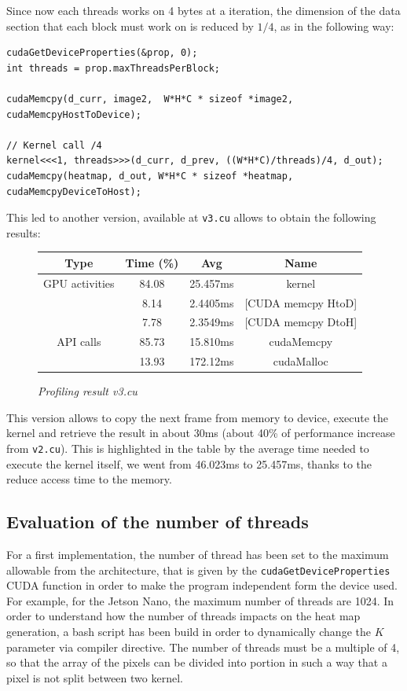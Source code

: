 \documentclass[paper=a4, fontsize=10pt]{scrartcl}	%
\begin{document}
	Since now each threads works on 4 bytes at a iteration, the dimension of the data section that each block must work on is reduced by $1/4$, as in the following way:
		\begin{lstlisting}[style=CStyle]
cudaGetDeviceProperties(&prop, 0);
int threads = prop.maxThreadsPerBlock;

cudaMemcpy(d_curr, image2,  W*H*C * sizeof *image2, cudaMemcpyHostToDevice);

// Kernel call /4
kernel<<<1, threads>>>(d_curr, d_prev, ((W*H*C)/threads)/4, d_out);
cudaMemcpy(heatmap, d_out, W*H*C * sizeof *heatmap, cudaMemcpyDeviceToHost);\end{lstlisting}

	This led to another version, available at \texttt{v3.cu} allows to obtain the following results:
	\begin{figure}[H]
		\centering
		\begin{center}
			\begin{tabular}{ |c|c|c|c| } 
				\hline
				\textbf{Type} & \textbf{Time} (\%) & \textbf{Avg} & \textbf{Name} \\ 
				\hline
				GPU activities & 84.08 & 25.457ms & kernel \\ 
				& 8.14 & 2.4405ms & [CUDA memcpy HtoD] \\ 
				& 7.78 & 2.3549ms & [CUDA memcpy DtoH] \\ 
				\hline
				API calls & 85.73 & 15.810ms & cudaMemcpy \\ 
				& 13.93 & 172.12ms & cudaMalloc \\ 
				\hline
			\end{tabular}
		\end{center}
		\label{fig:table_v3}
		\caption{\textit{Profiling result v3.cu}}
	\end{figure}
	
	This version allows to copy the next frame from memory to device, execute the kernel and retrieve the result in about 30ms (about 40\% of performance increase from \texttt{v2.cu}). This is highlighted in the table by the average time needed to execute the kernel itself, we went from 46.023ms to 25.457ms, thanks to the reduce access time to the memory.
	
	\subsection{Evaluation of the number of threads}
	\label{sec:thread_n}
	For a first implementation, the number of thread has been set to the maximum allowable from the architecture, that is given by the \texttt{cudaGetDeviceProperties} CUDA function in order to make the program independent form the device used. For example, for the Jetson Nano, the maximum number of threads are 1024.\newline\newline
	In order to understand how the number of threads impacts on the heat map generation, a bash script has been build in order to dynamically change the $K$ parameter via compiler directive. The number of threads must be a multiple of 4, so that the array of the pixels can be divided into portion in such a way that a pixel is not split between two kernel.
	
\end{document}
